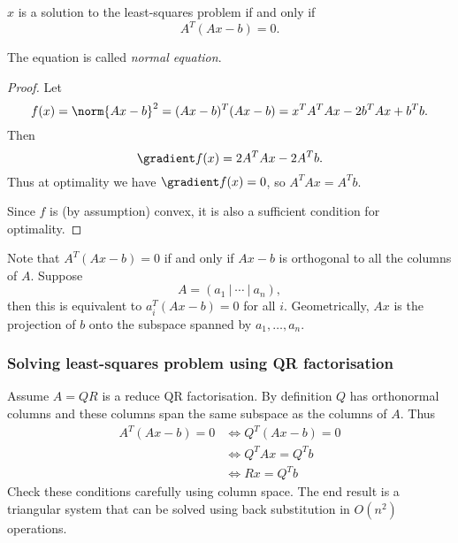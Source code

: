 \documentclass[a4paper]{article}
\begin{document}
\begin{theorem}
  \(x\) is a solution to the least-squares problem if and only if
  \[
    A^T(Ax - b) = 0.
  \]
\end{theorem}

The equation is called \emph{normal equation}.

\begin{proof}
  Let
  \[
    f(x) = \norm{Ax - b}^2 = (Ax - b)^T(Ax - b) = x^TA^TAx - 2b^TAx + b^Tb.
  \]
  Then
  \[
    \gradient f(x) = 2A^TAx - 2A^Tb.
  \]
  Thus at optimality we have \(\gradient f(x) = 0\), so \(A^TAx = A^Tb\).

  Since \(f\) is (by assumption) convex, it is also a sufficient condition for optimality.
\end{proof}

Note that \(A^T(Ax - b) = 0\) if and only if \(Ax - b\) is orthogonal to all the columns of \(A\). Suppose
\[
  A = (a_1 \ | \ \cdots \ | \ a_n),
\]
then this is equivalent to \(a_i^T(Ax - b) = 0\) for all \(i\). Geometrically, \(Ax\) is the projection of \(b\) onto the subspace spanned by \(a_1, \dots, a_n\).

\subsubsection{Solving least-squares problem using QR factorisation}

Assume \(A = QR\) is a reduce QR factorisation. By definition \(Q\) has orthonormal columns and these columns span the same subspace as the columns of \(A\). Thus
\begin{align*}
  A^T(Ax - b) = 0
  &\Leftrightarrow Q^T(Ax - b) = 0 \\
  &\Leftrightarrow Q^TAx = Q^Tb \\
  &\Leftrightarrow Rx = Q^Tb
\end{align*}
Check these conditions carefully using column space. The end result is a triangular system that can be solved using back substitution in \(O(n^2)\) operations.

\printindex

\iffalse
http://damtp.cam.ac.uk/user/hf323/L18-IB-NA/
\fi
\end{document}
